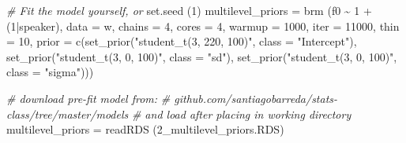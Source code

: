 \documentclass[
]{book}
\newenvironment{Shaded}{\begin{snugshade}}{\end{snugshade}}
\newcommand{\AttributeTok}[1]{\textcolor[rgb]{0.77,0.63,0.00}{#1}}
\newcommand{\CommentTok}[1]{\textcolor[rgb]{0.56,0.35,0.01}{\textit{#1}}}
\newcommand{\DecValTok}[1]{\textcolor[rgb]{0.00,0.00,0.81}{#1}}
\newcommand{\FunctionTok}[1]{\textcolor[rgb]{0.00,0.00,0.00}{#1}}
\newcommand{\NormalTok}[1]{#1}
\newcommand{\OtherTok}[1]{\textcolor[rgb]{0.56,0.35,0.01}{#1}}
\newcommand{\SpecialCharTok}[1]{\textcolor[rgb]{0.00,0.00,0.00}{#1}}
\newcommand{\StringTok}[1]{\textcolor[rgb]{0.31,0.60,0.02}{#1}}
\begin{document}
\begin{Shaded}
\begin{Highlighting}[]
\CommentTok{\# Fit the model yourself, or}
\FunctionTok{set.seed}\NormalTok{ (}\DecValTok{1}\NormalTok{)}
\NormalTok{multilevel\_priors }\OtherTok{=}  
  \FunctionTok{brm}\NormalTok{ (f0 }\SpecialCharTok{\textasciitilde{}} \DecValTok{1} \SpecialCharTok{+}\NormalTok{ (}\DecValTok{1}\SpecialCharTok{|}\NormalTok{speaker), }\AttributeTok{data =}\NormalTok{ w, }\AttributeTok{chains =} \DecValTok{4}\NormalTok{, }\AttributeTok{cores =} \DecValTok{4}\NormalTok{,}
       \AttributeTok{warmup =} \DecValTok{1000}\NormalTok{, }\AttributeTok{iter =} \DecValTok{11000}\NormalTok{, }\AttributeTok{thin =} \DecValTok{10}\NormalTok{,}
       \AttributeTok{prior =} \FunctionTok{c}\NormalTok{(}\FunctionTok{set\_prior}\NormalTok{(}\StringTok{"student\_t(3, 220, 100)"}\NormalTok{, }\AttributeTok{class =} \StringTok{"Intercept"}\NormalTok{),}
                 \FunctionTok{set\_prior}\NormalTok{(}\StringTok{"student\_t(3, 0, 100)"}\NormalTok{, }\AttributeTok{class =} \StringTok{"sd"}\NormalTok{),}
                 \FunctionTok{set\_prior}\NormalTok{(}\StringTok{"student\_t(3, 0, 100)"}\NormalTok{, }\AttributeTok{class =} \StringTok{"sigma"}\NormalTok{)))}

\CommentTok{\# download pre{-}fit model from: }
\CommentTok{\# github.com/santiagobarreda/stats{-}class/tree/master/models}
\CommentTok{\# and load after placing in working directory}
\NormalTok{multilevel\_priors }\OtherTok{=} \FunctionTok{readRDS}\NormalTok{ (}\StringTok{\textquotesingle{}2\_multilevel\_priors.RDS\textquotesingle{}}\NormalTok{)}
\end{Highlighting}
\end{Shaded}
\end{document}
